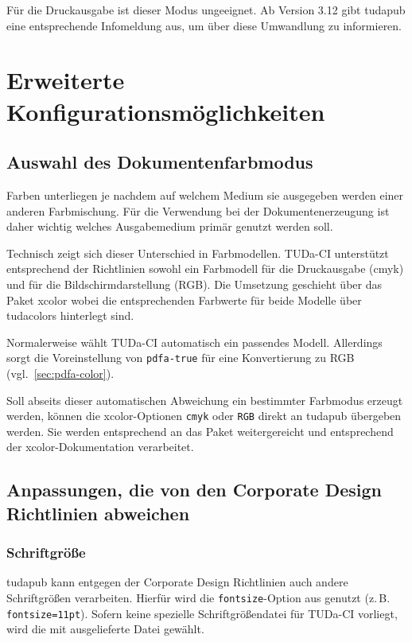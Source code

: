 \documentclass[
	ngerman,
	accentcolor=9c,%
	]{tudapub}
\let\code\texttt
\let\pck\textsf
\let\cls\textsf
\begin{document}
Für die Druckausgabe ist dieser Modus ungeeignet. Ab Version 3.12 gibt \cls{tudapub} eine entsprechende Infomeldung aus, um über diese Umwandlung zu informieren.

\section{Erweiterte Konfigurationsmöglichkeiten}

\subsection{Auswahl des Dokumentenfarbmodus}
Farben unterliegen je nachdem auf welchem Medium sie ausgegeben werden einer anderen Farbmischung. Für die Verwendung bei der Dokumentenerzeugung ist daher wichtig welches Ausgabemedium primär genutzt werden soll.

Technisch zeigt sich dieser Unterschied in Farbmodellen. TUDa-CI unterstützt entsprechend der Richtlinien sowohl ein Farbmodell für die Druckausgabe (cmyk) und für die Bildschirmdarstellung (RGB). Die Umsetzung geschieht über das Paket \pck{xcolor} wobei die entsprechenden Farbwerte für beide Modelle über \pck{tudacolors} hinterlegt sind.

Normalerweise wählt TUDa-CI automatisch ein passendes Modell. Allerdings sorgt die Voreinstellung von \code{pdfa-true} für eine Konvertierung zu RGB (vgl.~\ref{sec:pdfa-color}).

Soll abseits dieser automatischen Abweichung ein bestimmter Farbmodus erzeugt werden, können die \pck{xcolor}-Optionen \code{cmyk} oder \code{RGB} direkt an \cls{tudapub} übergeben werden. Sie werden entsprechend an das Paket weitergereicht und entsprechend der \pck{xcolor}-Dokumentation verarbeitet.

\subsection{Anpassungen, die von den Corporate Design Richtlinien abweichen}

\subsubsection{Schriftgröße}
\cls{tudapub} kann entgegen der Corporate Design Richtlinien auch andere Schriftgrößen verarbeiten. Hierfür wird die \code{fontsize}-Option aus \KOMAScript{} genutzt (z.\,B. \code{fontsize=11pt}). Sofern keine spezielle Schriftgrößendatei für TUDa-CI vorliegt, wird die mit \KOMAScript{} ausgelieferte Datei gewählt.
\end{document}
